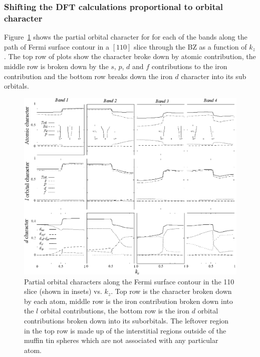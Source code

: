 \subsubsection{Shifting the \ac{DFT} calculations proportional to orbital character}
\label{Sec:ResD:ShiftingDFTPropToOrbitalCharacter}

Figure~\ref{Fig:ResD:Band2DCharacterVsKz} shows the partial orbital character for for each of the bands along the path of Fermi surface contour in a $[110]$ slice through the \BaFeP \ac{BZ} as a function of $k_z$. The top row of plots show the character broke down by atomic contribution, the middle row is broken down by the $s$, $p$, $d$ and $f$ contributions to the iron contribution and the bottom row breaks down the iron $d$ character into its sub orbitals.
\begin{figure}[htbp]
    \begin{center}
        \includegraphics[scale=0.95]{Chapter-dHvABaFe2P2/Figures/AngleDepMeasurements/BandCharacterVsKz/AllBandCharacterVsKz}
        \caption{Partial orbital characters along the Fermi surface contour in the 110 slice (shown in insets) vs. $k_z$. Top row is the character broken down by each atom, middle row is the iron contribution broken down into the $l$ orbital contributions, the bottom row is the iron $d$ orbital contributions broken down into its suborbitals. The leftover region in the top row is made up of the interstitial regions outside of the muffin tin spheres which are not associated with any particular atom.}
        \label{Fig:ResD:Band2DCharacterVsKz}
    \end{center}
\end{figure}

